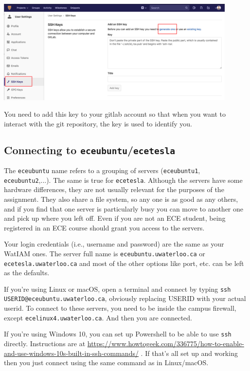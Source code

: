 \documentclass[letterpaper,10pt]{article}
\begin{document}
\begin{center}
	\includegraphics[width=0.9\textwidth]{images/gitlab-sshkey.png}
\end{center}

You need to add this key to your gitlab account so that when you want to interact with the git repository, the key is used to identify you.

\subsection*{Connecting to \texttt{eceubuntu}/\texttt{ecetesla}}

The \texttt{eceubuntu} name refers to a grouping of servers (\texttt{eceubuntu1}, \texttt{eceubuntu2},...). The same is true for \texttt{ecetesla}. Although the servers have some hardware differences, they are not usually relevant for the purposes of the assignment. They also share a file system, so any one is as good as any others, and if you find that one server is particularly busy you can move to another one and pick up where you left off. Even if you are not an ECE student, being registered in an ECE course should grant you access to the servers.

Your login credentials (i.e., username and password) are the same as your WatIAM ones. The server full name is \texttt{eceubuntu.uwaterloo.ca} or \texttt{ecetesla.uwaterloo.ca} and most of the other options like port, etc. can be left as the defaults. 

If you're using Linux or macOS, open a terminal and connect by typing \texttt{ssh USERID@eceubuntu.uwaterloo.ca}, obviously replacing USERID with your actual userid. To connect to these servers, you need to be inside the campus firewall, except \texttt{ecelinux4.uwaterloo.ca}. And then you are connected. 

If you're using Windows 10, you can set up Powershell to be able to use \texttt{ssh} directly. Instructions are at \url{https://www.howtogeek.com/336775/how-to-enable-and-use-windows-10s-built-in-ssh-commands/} . If that's all set up and working then you just connect using the same command as in Linux/macOS.
\end{document}
